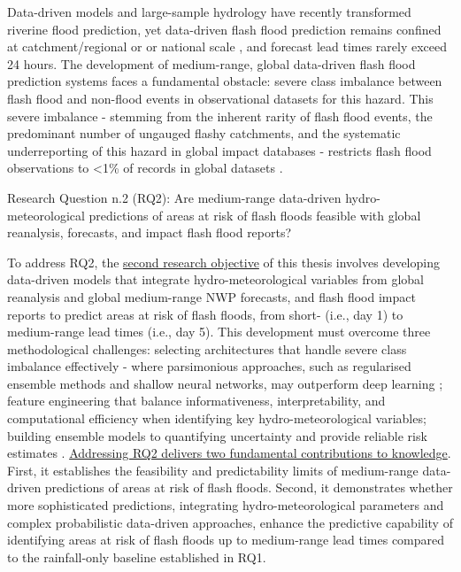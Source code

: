 Data-driven  models \citep{Nearing_2024} and large-sample hydrology \citep{Kratzert_2024} have recently transformed riverine flood prediction, yet data-driven flash flood prediction remains confined at catchment/regional or \citep{Song_2020, Saleh_2024, Ding_2025, Zhao_2025} or national scale \citep{Zhao_2022}, and forecast lead times rarely exceed 24 hours. The development of medium-range, global data-driven flash flood prediction systems faces a fundamental obstacle: severe class imbalance between flash flood and non-flood events in observational datasets for this hazard. This severe imbalance - stemming from the inherent rarity of flash flood events, the predominant number of ungauged flashy catchments, and the systematic underreporting of this hazard in global impact databases - restricts flash flood observations to <1\% of records in global datasets \citep{Panwar_2020, Kratzert_2023, Färber_2024, Jonkman_2024}.

\begin{tcolorbox}[
  colframe=colour_chapter6,  
  colback=white,           
  sharp corners,        
  boxrule=2mm,          
  left=0mm,             
  right=0mm,            
  toprule=0mm,          
  bottomrule=0mm,       
  rightrule=2mm        
]
{\color{colour_chapter6} {\setlength{\parindent}{1.0em} Research Question n.2 (RQ2): Are medium-range data-driven hydro-meteorological predictions of areas at risk of flash floods feasible with global reanalysis, forecasts, and impact flash flood reports?
}}
\end{tcolorbox}

\noindent To address RQ2, the \uline{second research objective} of this thesis involves developing data-driven models that integrate hydro-meteorological variables from global reanalysis and global medium-range NWP forecasts, and flash flood impact reports to predict areas at risk of flash floods, from short- (i.e., day 1) to medium-range lead times (i.e., day 5). This development must overcome three methodological challenges: selecting architectures that handle severe class imbalance effectively - where parsimonious approaches, such as regularised ensemble methods and shallow neural networks, may outperform deep learning \citep{Kumar_2021, Xu_2022, Luo_2025a}; feature engineering that balance informativeness, interpretability, and computational efficiency when identifying key hydro-meteorological variables; building ensemble models to quantifying uncertainty and provide reliable risk estimates \citep{Saleh_2024}. \uline{Addressing RQ2 delivers two fundamental contributions to knowledge}. First, it establishes the feasibility and predictability limits of medium-range data-driven predictions of areas at risk of flash floods. Second, it demonstrates whether more sophisticated predictions, integrating hydro-meteorological parameters and complex probabilistic data-driven approaches, enhance the predictive capability of identifying areas at risk of flash floods up to medium-range lead times compared to the rainfall-only baseline established in RQ1. 

